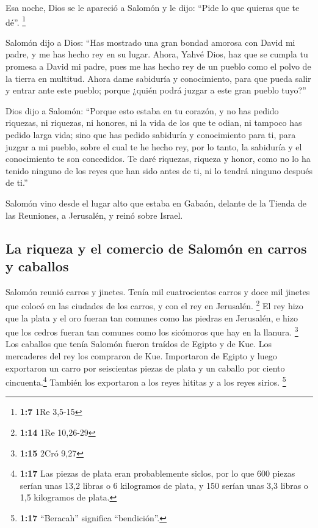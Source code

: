  Esa noche, Dios se le apareció a Salomón y le dijo:
``Pide lo que quieras que te dé''. \footnote{\textbf{1:7} 1Re 3,5-15}

 Salomón dijo a Dios: ``Has mostrado una gran bondad
amorosa con David mi padre, y me has hecho rey en su lugar.
 Ahora, Yahvé Dios, haz que se cumpla tu promesa a David
mi padre, pues me has hecho rey de un pueblo como el polvo de la tierra
en multitud.  Ahora dame sabiduría y conocimiento, para
que pueda salir y entrar ante este pueblo; porque ¿quién podrá juzgar a
este gran pueblo tuyo?''

 Dios dijo a Salomón: ``Porque esto estaba en tu corazón,
y no has pedido riquezas, ni riquezas, ni honores, ni la vida de los que
te odian, ni tampoco has pedido larga vida; sino que has pedido
sabiduría y conocimiento para ti, para juzgar a mi pueblo, sobre el cual
te he hecho rey,  por lo tanto, la sabiduría y el
conocimiento te son concedidos. Te daré riquezas, riqueza y honor, como
no lo ha tenido ninguno de los reyes que han sido antes de ti, ni lo
tendrá ninguno después de ti.''

 Salomón vino desde el lugar alto que estaba en Gabaón,
delante de la Tienda de las Reuniones, a Jerusalén, y reinó sobre
Israel.

\hypertarget{la-riqueza-y-el-comercio-de-salomuxf3n-en-carros-y-caballos}{%
\subsection{La riqueza y el comercio de Salomón en carros y
caballos}\label{la-riqueza-y-el-comercio-de-salomuxf3n-en-carros-y-caballos}}

 Salomón reunió carros y jinetes. Tenía mil cuatrocientos
carros y doce mil jinetes que colocó en las ciudades de los carros, y
con el rey en Jerusalén. \footnote{\textbf{1:14} 1Re 10,26-29}
 El rey hizo que la plata y el oro fueran tan comunes
como las piedras en Jerusalén, e hizo que los cedros fueran tan comunes
como los sicómoros que hay en la llanura. \footnote{\textbf{1:15} 2Cró
  9,27}  Los caballos que tenía Salomón fueron traídos de
Egipto y de Kue. Los mercaderes del rey los compraron de Kue.
 Importaron de Egipto y luego exportaron un carro por
seiscientas piezas de plata y un caballo por ciento
cincuenta.\footnote{\textbf{1:17} Las piezas de plata eran probablemente
  siclos, por lo que 600 piezas serían unas 13,2 libras o 6 kilogramos
  de plata, y 150 serían unas 3,3 libras o 1,5 kilogramos de plata.}
También los exportaron a los reyes hititas y a los reyes sirios.
\footnote{\textbf{1:17} ``Beracah'' significa ``bendición''.}

